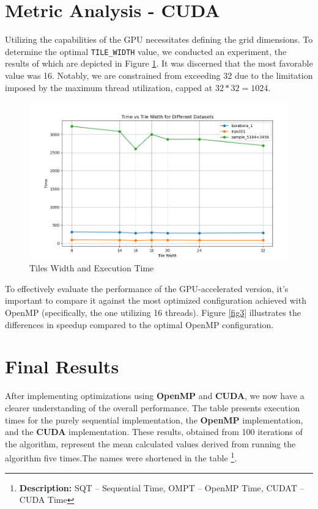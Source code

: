 \documentclass[sigconf]{acmart}
\begin{document}
\section{Metric Analysis - CUDA}
Utilizing the capabilities of the GPU necessitates defining the grid dimensions. To determine the optimal \texttt{TILE\_WIDTH} value, we conducted an experiment, the results of which are depicted in Figure \ref{fig2}. It was discerned that the most favorable value was 16. Notably, we are constrained from exceeding 32 due to the limitation imposed by the maximum thread utilization, capped at $32 * 32 = 1024$.

\begin{figure}[h]
  \centering
  \includegraphics[width=\linewidth]{images/tilesss.png}
  \caption{Tiles Width and Execution Time}
 \label{fig2}
\end{figure}
To effectively evaluate the performance of the GPU-accelerated version, it's important to compare it against the most optimized configuration achieved with OpenMP (specifically, the one utilizing 16 threads). Figure \ref{fig3} illustrates the differences in speedup compared to the optimal OpenMP configuration.



\section{Final Results}
After implementing optimizations using \textbf{OpenMP} and \textbf{CUDA}, we now have a clearer understanding of the overall performance. The table presents execution times for the purely sequential implementation, the \textbf{OpenMP} implementation, and the \textbf{CUDA} implementation. These results, obtained from 100 iterations of the algorithm, represent the mean calculated values derived from running the algorithm five times.The names were shortened in the table \footnote{\textbf{Description:} SQT -- Sequential Time, OMPT -- OpenMP Time, CUDAT -- CUDA Time}.
\end{document}

